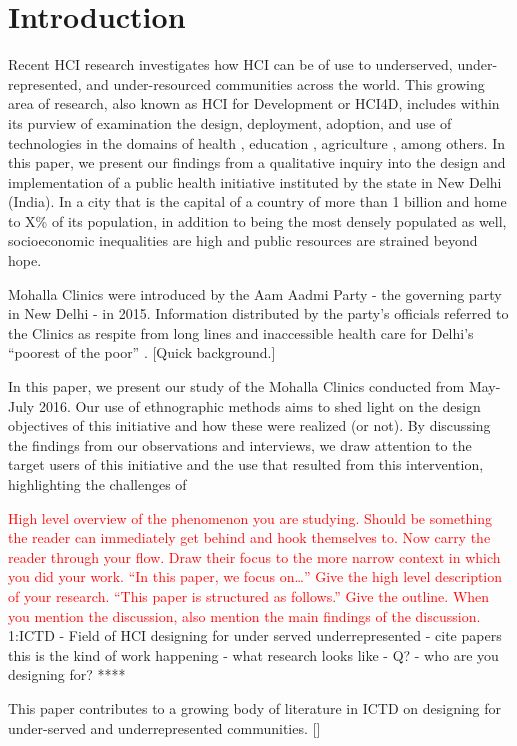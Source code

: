 \section{Introduction}
Recent HCI research investigates how HCI can be of use to underserved, under-represented, and under-resourced communities across the world. This growing area of research, also known as HCI for Development or HCI4D, includes within its purview of examination the design, deployment, adoption, and use of technologies in the domains of health \cite{PH-CHI;TP}, education \cite{Kam}, agriculture \cite{Patel}, among others. In this paper, we present our findings from a qualitative inquiry into the design and implementation of a public health initiative instituted by the state in New Delhi (India). In a city that is the capital of a country of more than 1 billion and home to X\% of its population, in addition to being the most densely populated as well, socioeconomic inequalities are high and public resources are strained beyond hope. 

Mohalla Clinics were introduced by the Aam Aadmi Party - the governing party in New Delhi - in 2015. Information distributed by the party's officials referred to the Clinics as respite from long lines and inaccessible health care for Delhi's ``poorest of the poor'' \cite{}. [Quick background.]

In this paper, we present our study of the Mohalla Clinics conducted from May-July 2016. Our use of ethnographic methods aims to shed light on the design objectives of this initiative and how these were realized (or not). By discussing the findings from our observations and interviews, we draw attention to the target users of this initiative and the use that resulted from this intervention, highlighting the challenges of 

\textcolor{red}{High level overview of the phenomenon you are studying. Should be something the reader can immediately get behind and hook themselves to. 
Now carry the reader through your flow. Draw their focus to the more narrow context in which you did your work.  
“In this paper, we focus on…” Give the high level description of your research.
“This paper is structured as follows.” Give the outline. When you mention the discussion, also mention the main findings of the discussion.}
1:ICTD - Field of HCI designing for under served underrepresented - cite papers this is the kind of work happening - what research looks like - Q? - who are you designing for?
****

This paper contributes to a growing body of literature in ICTD on designing for under-served and underrepresented communities. []

